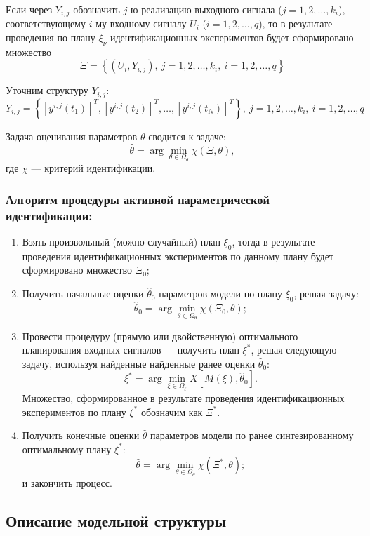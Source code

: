 \documentclass[a4paper,14pt]{extarticle}
\begin{document}
Если через $Y_{i,j}$ обозначить $j$-ю реализацию выходного сигнала ($j = 1, 2,
\ldots, k_i$), соответствующему $i$-му входному сигналу $U_i$ ($i = 1, 2,
\ldots, q$), то в результате проведения по плану $\xi_{\nu}$ идентификационных
экспериментов будет сформировано множество
\[
	\Xi = \left\{ 
		(U_i, Y_{i,j}),\ j = 1, 2, \ldots, k_i,\ i = 1, 2, \ldots, q
	\right\}
\]

Уточним структуру $Y_{i,j}$:
\[
	Y_{i,j}	= \left\{ 
		[y^{i,j}(t_1)]^T, [y^{i,j}(t_2)]^T, \ldots, [y^{i,j}(t_N)]^T \right\},\
		j = 1, 2, \ldots, k_i,\ i = 1, 2, \ldots, q
\]

Задача оценивания параметров $\theta$ сводится к задаче:
\[
	\hat{\theta} = \arg \min\limits_{\theta \in \Omega_{\theta}} \chi(\Xi,
	\theta),
\]
где $\chi$ --- критерий идентификации.

\subsubsection{Алгоритм процедуры активной параметрической идентификации:}

\begin{enumerate}
	\item Взять произвольный (можно случайный) план $\xi_0$,
		тогда в результате проведения идентификационных экспериментов по данному
		плану будет сформировано множество $\Xi_0$;
	\item Получить начальные оценки $\hat{\theta}_0$ параметров модели
		по плану $\xi_0$, решая задачу:
\[
	\hat{\theta}_0 = \arg\min\limits_{\theta \in \Omega_{\theta}}
		\chi(\Xi_0, \theta);
\]
	\item Провести процедуру (прямую или двойственную) оптимального планирования
		входных сигналов --- получить план $\xi^{*}$, решая следующую задачу,
		используя найденные найденные ранее оценки $\hat{\theta}_0$:
\[
	\xi^{*} = \arg\min\limits_{\xi \in \Omega_{\xi}} X[M(\xi), \hat{\theta}_0].
\]
	Множество, сформированное в результате проведения идентификационных
		экспериментов по плану $\xi^{*}$ обозначим как $\Xi^{*}$.
	\item Получить конечные оценки $\hat{\theta}$ параметров модели по ранее
		синтезированному оптимальному плану $\xi^{*}$:
\[
	\hat{\theta} = \arg\min\limits_{\theta \in \Omega_{\theta}} \chi(\Xi^{*},
		\theta);
\]
и закончить процесс.

\end{enumerate}

\newpage
\subsection{Описание модельной структуры}
\end{document}
